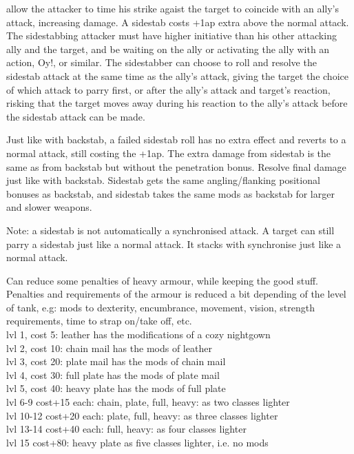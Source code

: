  allow the attacker to time his strike agaist the target to coincide with an ally's attack, increasing damage. A sidestab costs +1ap extra above the normal attack. The sidestabbing attacker must have higher initiative than his other attacking ally and the target, and be waiting on the ally or activating the ally with an action, Oy!, or similar. The sidestabber can choose to roll and resolve the sidestab attack at the same time as the ally's attack, giving the target the choice of which attack to parry first, or after the ally's attack and target's reaction, risking that the target moves away during his reaction to the ally's attack before the sidestab attack can be made.

Just like with backstab, a failed sidestab roll has no extra effect and reverts to a normal attack, still costing the +1ap. The extra damage from sidestab is the same as from backstab but without the penetration bonus. Resolve final damage just like with backstab. Sidestab gets the same angling/flanking positional bonuses as backstab, and sidestab takes the same mods as backstab for larger and slower weapons.

Note: a sidestab is not automatically a synchronised attack. A target can still parry a sidestab just like a normal attack. It stacks with synchronise just like a normal attack.



 Can reduce some penalties of heavy armour, while keeping the good stuff. Penalties and requirements of the armour is reduced a bit depending of the level of tank, e.g: mods to dexterity, encumbrance, movement, vision, strength requirements, time to strap on/take off, etc.\\
lvl 1, cost  5: leather has the modifications of a cozy nightgown\\
lvl 2, cost 10: chain mail has the mods of leather \\
lvl 3, cost 20: plate mail has the mods of chain mail \\
lvl 4, cost 30: full plate has the mods of plate mail \\
lvl 5, cost 40: heavy plate has the mods of full plate \\
lvl 6-9 cost+15 each: chain, plate, full, heavy: as two classes lighter \\ %
lvl 10-12 cost+20 each: plate, full, heavy: as three classes lighter \\    %
lvl 13-14 cost+40 each: full, heavy: as four classes lighter \\            %
lvl 15 cost+80: heavy plate as five classes lighter, i.e. no mods          %

